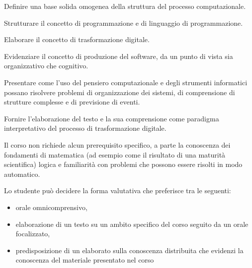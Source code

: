 \documentclass[11pt, a4paper]{article}
\begin{document}

\begin{borderedsquare}
     \setlength\itemsep{0.3em}        
	\item Definire una base solida omogenea della struttura del processo computazionale.
	\item Strutturare il concetto di programmazione e di linguaggio di programmazione.
	\item Elaborare il concetto di trasformazione digitale.
	\item Evidenziare il concetto di produzione del software,  da un punto di vista sia organizzativo che cognitivo.
	\item Presentare come l'uso del pensiero computazionale e degli strumenti informatici possano risolvere problemi di organizzazione dei sistemi, di comprensione di strutture complesse e di previsione di eventi.
	\item Fornire l'elaborazione del testo e la sua comprensione come paradigma interpretativo del processo di trasformazione digitale.
\end{borderedsquare}
        

\noindent Il corso non richiede alcun prerequisito specifico, a parte la conoscenza dei fondamenti di matematica (ad esempio come il risultato di una maturit\`{a} scientifica) logica e familiarit\`{a} con problemi che possono essere risolti in modo automatico.


Lo studente pu\`{o} decidere la forma valutativa che preferisce tra le seguenti:
\begin{itemize}
    \item orale omnicomprensivo,
    \item elaborazione di un testo su un ambito specifico del corso seguito da un orale focalizzato,
    \item predisposizione di un elaborato sulla conoscenza distribuita che evidenzi la conoscenza del materiale presentato nel corso
\end{itemize}
\end{document}
